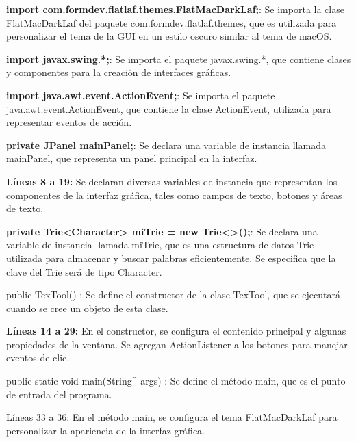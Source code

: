 \documentclass{article}
\begin{document}
\begin{itemize}
	\item \textbf{import com.formdev.flatlaf.themes.FlatMacDarkLaf;}: Se importa la clase FlatMacDarkLaf del paquete com.formdev.flatlaf.themes, que es utilizada para personalizar el tema de la GUI en un estilo oscuro similar al tema de macOS.

		\item \textbf{import javax.swing.*;}: Se importa el paquete javax.swing.*, que contiene clases y componentes para la creación de interfaces gráficas.

		\item \textbf{import java.awt.event.ActionEvent;}: Se importa el paquete java.awt.event.ActionEvent, que contiene la clase ActionEvent, utilizada para representar eventos de acción.

		\item \textbf{private JPanel mainPanel;}: Se declara una variable de instancia llamada mainPanel, que representa un panel principal en la interfaz.

		\item \textbf{Líneas 8 a 19:} Se declaran diversas variables de instancia que representan los componentes de la interfaz gráfica, tales como campos de texto, botones y áreas de texto.

		\item \textbf{private Trie<Character> miTrie = new Trie<>();}: Se declara una variable de instancia llamada miTrie, que es una estructura de datos Trie utilizada para almacenar y buscar palabras eficientemente. Se especifica que la clave del Trie será de tipo Character.

		\item {public TexTool() {:} Se define el constructor de la clase TexTool, que se ejecutará cuando se cree un objeto de esta clase.

		\item \textbf{Líneas 14 a 29:} En el constructor, se configura el contenido principal y algunas propiedades de la ventana. Se agregan ActionListener a los botones para manejar eventos de clic.

		\item {public static void main(String[] args) {:} Se define el método main, que es el punto de entrada del programa.

		\item {Líneas 33 a 36:} En el método main, se configura el tema FlatMacDarkLaf para personalizar la apariencia de la interfaz gráfica.

}}
\end{itemize}
\end{document}
